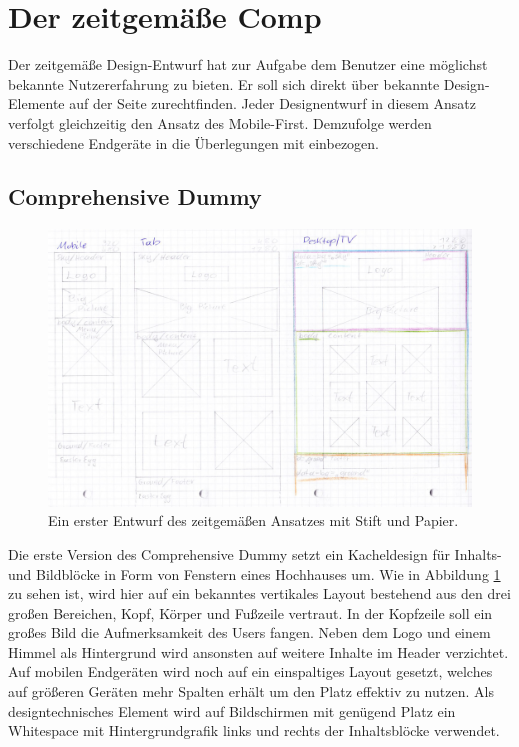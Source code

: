 \section{Der zeitgemäße Comp}
Der zeitgemäße Design-Entwurf hat zur Aufgabe dem Benutzer eine möglichst bekannte Nutzererfahrung zu bieten. Er soll sich direkt über bekannte Design-Elemente auf der Seite zurechtfinden. 
Jeder Designentwurf in diesem Ansatz verfolgt gleichzeitig den Ansatz des Mobile-First. Demzufolge werden verschiedene Endgeräte in die Überlegungen mit einbezogen.

\subsection{Comprehensive Dummy}
\begin{figure} [ht]
	\includegraphics[width=\textwidth]{./img/zeitg_comp1.jpg}
	\caption{Ein erster Entwurf des zeitgemäßen Ansatzes mit Stift und Papier.}
	\label{zeitg:Comp1}
\end{figure}

Die erste Version des Comprehensive Dummy setzt ein Kacheldesign für Inhalts- und Bildblöcke in Form von Fenstern eines Hochhauses um. Wie in Abbildung \ref{zeitg:Comp1} zu sehen ist, wird hier auf ein bekanntes vertikales Layout bestehend aus den drei großen Bereichen, Kopf, Körper und Fußzeile vertraut. In der Kopfzeile soll ein großes Bild die Aufmerksamkeit des Users fangen. Neben dem Logo und einem Himmel als Hintergrund wird ansonsten auf weitere Inhalte im Header verzichtet. Auf mobilen Endgeräten wird noch auf ein einspaltiges Layout gesetzt, welches auf größeren Geräten mehr Spalten erhält um den Platz effektiv zu nutzen. Als designtechnisches Element wird auf Bildschirmen mit genügend Platz ein Whitespace mit Hintergrundgrafik links und rechts der Inhaltsblöcke verwendet.

